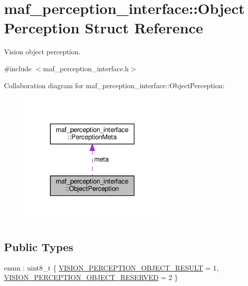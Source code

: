 \hypertarget{structmaf__perception__interface_1_1ObjectPerception}{}\section{maf\+\_\+perception\+\_\+interface\+:\+:Object\+Perception Struct Reference}
\label{structmaf__perception__interface_1_1ObjectPerception}


Vision object perception.  




{\ttfamily \#include $<$maf\+\_\+perception\+\_\+interface.\+h$>$}



Collaboration diagram for maf\+\_\+perception\+\_\+interface\+:\+:Object\+Perception\+:\nopagebreak
\begin{figure}[H]
\begin{center}
\leavevmode
\includegraphics[width=206pt]{structmaf__perception__interface_1_1ObjectPerception__coll__graph}
\end{center}
\end{figure}
\subsection*{Public Types}
\begin{DoxyCompactItemize}
\item 
enum \+: uint8\+\_\+t \{ \hyperlink{structmaf__perception__interface_1_1ObjectPerception_aaf0034a17096af5e0ab25dabb2f9dabeab9a469eae84533c0c5d4905395c48852}{V\+I\+S\+I\+O\+N\+\_\+\+P\+E\+R\+C\+E\+P\+T\+I\+O\+N\+\_\+\+O\+B\+J\+E\+C\+T\+\_\+\+R\+E\+S\+U\+LT} = 1, 
\hyperlink{structmaf__perception__interface_1_1ObjectPerception_aaf0034a17096af5e0ab25dabb2f9dabead58ed62c5b1816f2f0c4581a5ad4adb5}{V\+I\+S\+I\+O\+N\+\_\+\+P\+E\+R\+C\+E\+P\+T\+I\+O\+N\+\_\+\+O\+B\+J\+E\+C\+T\+\_\+\+R\+E\+S\+E\+R\+V\+ED} = 2
 \}
\end{DoxyCompactItemize}

